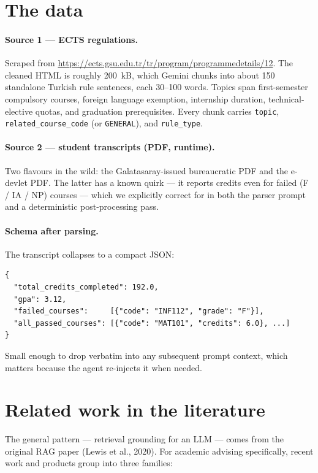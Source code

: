 \documentclass[11pt,a4paper]{article}
\begin{document}
\section{The data}

\paragraph{Source 1 --- ECTS regulations.} Scraped from
\url{https://ects.gsu.edu.tr/tr/program/programmedetails/12}. The cleaned HTML is
roughly 200~kB, which Gemini chunks into about 150 standalone Turkish rule
sentences, each 30--100 words. Topics span first-semester compulsory courses,
foreign language exemption, internship duration, technical-elective quotas, and
graduation prerequisites. Every chunk carries \texttt{topic},
\texttt{related\_course\_code} (or \texttt{GENERAL}), and \texttt{rule\_type}.

\paragraph{Source 2 --- student transcripts (PDF, runtime).} Two flavours in the
wild: the Galatasaray-issued bureaucratic PDF and the e-devlet PDF. The latter
has a known quirk --- it reports credits even for failed (F / IA / NP) courses
--- which we explicitly correct for in both the parser prompt and a
deterministic post-processing pass.

\paragraph{Schema after parsing.} The transcript collapses to a compact JSON:

\begin{lstlisting}
{
  "total_credits_completed": 192.0,
  "gpa": 3.12,
  "failed_courses":     [{"code": "INF112", "grade": "F"}],
  "all_passed_courses": [{"code": "MAT101", "credits": 6.0}, ...]
}
\end{lstlisting}

Small enough to drop verbatim into any subsequent prompt context, which matters
because the agent re-injects it when needed.

\section{Related work in the literature}

The general pattern --- retrieval grounding for an LLM --- comes from the
original RAG paper (Lewis et al., 2020). For academic advising specifically,
recent work and products group into three families:
\end{document}
